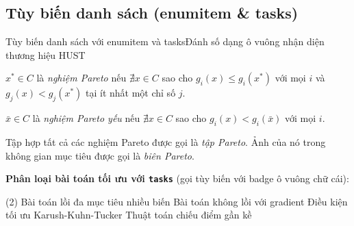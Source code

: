 \documentclass[aspectratio=169,10pt]{beamer}
\begin{document}
\subsection{Tùy biến danh sách (enumitem \& tasks)}
\begin{frame}{Tùy biến danh sách với enumitem và tasks}{Đánh số dạng ô vuông nhận diện thương hiệu HUST}
  \begin{definition}
    \begin{hustsqlist}
      \item $x^* \in C$ là \emph{nghiệm Pareto} nếu $\nexists x \in C$ sao cho $g_i(x) \le g_i(x^*)$ với mọi $i$ và $g_j(x) < g_j(x^*)$ tại ít nhất một chỉ số $j$. \label{def:pareto}
      \item $\bar{x} \in C$ là \emph{nghiệm Pareto yếu} nếu $\nexists x \in C$ sao cho $g_i(x) < g_i(\bar{x})$ với mọi $i$.
      \item Tập hợp tất cả các nghiệm Pareto được gọi là \emph{tập Pareto}. Ảnh của nó trong không gian mục tiêu được gọi là \emph{biên Pareto}.
    \end{hustsqlist}
  \end{definition}
  \vskip 2pt
  \textbf{Phân loại bài toán tối ưu với \texttt{tasks}} (gọi tùy biến với badge ô vuông chữ cái):
  \begin{tasks}[label=\hustitemsq{\alph*}, label-width=18pt, item-indent=22pt, label-format={\bfseries\color{white}}](2)
    \task Bài toán lồi đa mục tiêu nhiều biến
    \task Bài toán không lồi với gradient
    \task Điều kiện tối ưu Karush-Kuhn-Tucker
    \task Thuật toán chiếu điểm gần kề
  \end{tasks}
\end{frame}
\end{document}
